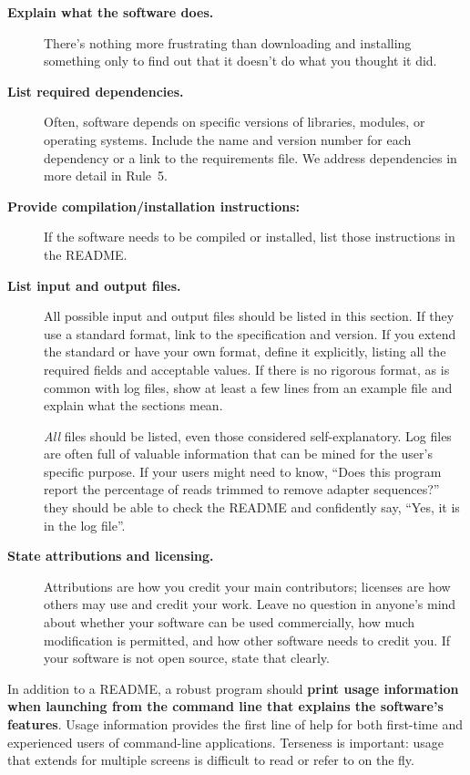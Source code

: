 \documentclass[10pt,letterpaper]{article}
\newcommand{\ruleminor}[1]{\textbf{#1}}
\begin{document}
\begin{description}

\item[\ruleminor{Explain what the software does.}] 
There's nothing more frustrating
than downloading and installing something only to
find out that it doesn't do what you thought it did.

\item[\ruleminor{List required dependencies.}] Often, software depends on
specific versions of libraries, modules, or operating systems. Include the name and
version number for each dependency or a link to the requirements file. 
We address dependencies in more detail in Rule~5.

\item[\ruleminor{Provide compilation/installation instructions:}]
If the software needs to be compiled
or installed, list those instructions in the README.

\item[\ruleminor{List input and output files.}] All possible input and output files
should be listed in this section. 
If they use a standard format, link to the specification and
version. If you extend the standard or have your own format, define it
explicitly, listing all the required fields and acceptable values.
If there is no rigorous format, as is common with log files, show at least a
few lines from an
example file and explain what the sections mean.

\emph{All} files should be listed, even those considered self-explanatory. Log
files are often full of valuable information that can be
mined for the user's specific purpose. If your users might need to know,
``Does this program report the percentage of reads trimmed to remove
adapter sequences?'' they should be able to check the README and confidently
say, ``Yes, it is in the log file''.

\item[\ruleminor{State attributions and licensing.}] Attributions are how you credit
your main contributors; licenses are how others may use and
credit your work.
Leave no
question in anyone's mind about whether your software can be used
commercially, how much modification is permitted, and how other software
needs to credit you. If your software is not open source, state that clearly.
\end{description}

In addition to a README, a robust program should
\ruleminor{print usage information when launching from the command line that explains the software's features}.
Usage information provides the first line of help for both first-time and
experienced users of command-line applications. Terseness is
important: usage that extends for multiple screens is 
difficult to read or refer to on the fly.
\end{document}

